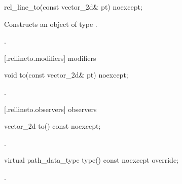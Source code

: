 \begin{itemdecl}
    rel_line_to(const vector_2d& pt) noexcept;
\end{itemdecl}
\begin{itemdescr}
	\pnum
	\effects
	Constructs an object of type .
	
	\pnum
	\postconditions
	.
\end{itemdescr}

 [\iotwod.rellineto.modifiers]{ modifiers}

\begin{itemdecl}
    void to(const vector_2d& pt) noexcept;
\end{itemdecl}
\begin{itemdescr}
	\pnum
	\postconditions
	.
	
\end{itemdescr}

 [\iotwod.rellineto.observers]{ observers}

\begin{itemdecl}
    vector_2d to() const noexcept;
\end{itemdecl}
\begin{itemdescr}
	\pnum
	\returns
	.

\end{itemdescr}

\begin{itemdecl}
    virtual path_data_type type() const noexcept override;
\end{itemdecl}
\begin{itemdescr}
	\pnum
	\returns
	.

\end{itemdescr}
